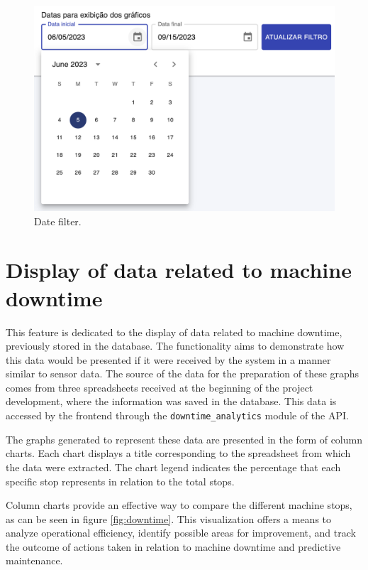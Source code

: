 \begin{figure}[htbp]
	\centering
	\includegraphics[scale=0.4]{images/datetimeFilter.png}
	\caption{Date filter.}
	\label{fig:loadDataByDate}
\end{figure}

\section[Display of data related to machine downtime]{Display of data related to machine downtime}\label{sec:downtime}

This feature is dedicated to the display of data related to machine downtime, previously stored in the database. The functionality aims to demonstrate how this data would be presented if it were received by the system in a manner similar to sensor data. The source of the data for the preparation of these graphs comes from three spreadsheets received at the beginning of the project development, where the information was saved in the database. This data is accessed by the frontend through the \texttt{downtime\_analytics} module of the \gls{API}.

The graphs generated to represent these data are presented in the form of column charts. Each chart displays a title corresponding to the spreadsheet from which the data were extracted. The chart legend indicates the percentage that each specific stop represents in relation to the total stops.

Column charts provide an effective way to compare the different machine stops, as can be seen in figure \ref{fig:downtime}. This visualization offers a means to analyze operational efficiency, identify possible areas for improvement, and track the outcome of actions taken in relation to machine downtime and predictive maintenance.

